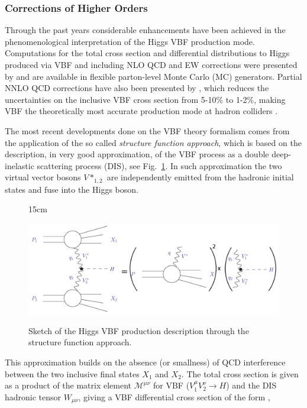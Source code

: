 \subsubsection{Corrections of Higher Orders}
Through the past years considerable enhancements have been achieved in the phenomenological interpretation of the Higgs VBF production mode. Computations for the total cross section and differential distributions to Higgs produced via VBF and including NLO QCD and EW corrections were presented by \cite{bib:Phys46-203-1998,bib:PhysRevLett69-3274-1992} and are available in flexible parton-level Monte Carlo (MC) generators. Partial NNLO QCD corrections have also been presented by \cite{bib:PhysRevD77-053010-2008,bib:PhysRevLett105-011801-2010}, which reduces the uncertainties on the inclusive VBF cross section from 5-10$\%$ to 1-2$\%$, making VBF the theoretically most accurate production mode at hadron colliders \cite{bib:ChinPhysC-38-9-2014}. 

The most recent developments done on the VBF theory formalism comes from the application of the so called \textit{structure function approach}, which is based on the description, in very good approximation, of the VBF process as a double deep-inelastic scattering process (DIS), see Fig.~\ref{fig:vbf_DIS_approx}. In such approximation the two virtual vector bosons $V*_{1,2}$ are independently emitted from the hadronic initial states and fuse into the Higgs boson. 

\begin{figure}[htbp]{15cm}
	\caption{Sketch of the Higgs VBF production description through the structure function approach.}
	\includegraphics[scale=0.4]{ChapterTheory/figs/vbf_DIS_approximation}
	\label{fig:vbf_DIS_approx}
\end{figure}

This approximation builds on the absence (or smallness) of QCD interference between the two inclusive final states $X_{1}$ and $X_{2}$. The total cross section is given as a product of the matrix element $\mathcal{M}^{\mu\nu}$ for VBF ($V_{1}^{\mu}V_{2}^{\nu} \rightarrow H$) and the DIS hadronic tensor $W_{\mu\nu}$, giving a VBF differential cross section of the form \cite{bib:PhysRevLett105-011801-2010,bib:PhysRevLett69-3274-1992},

